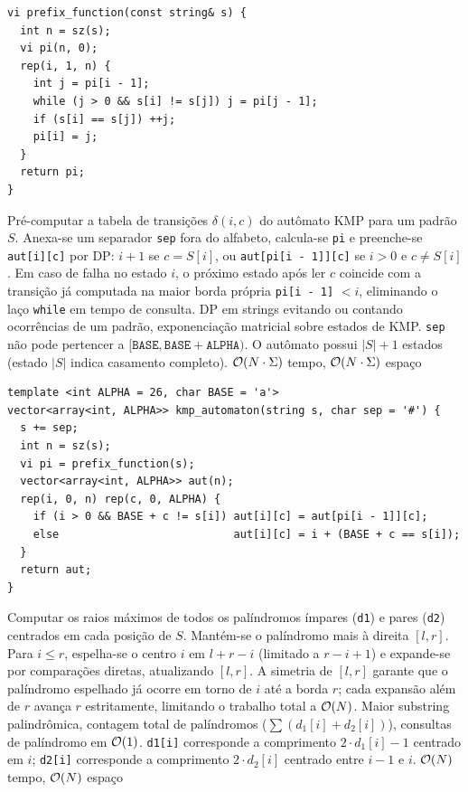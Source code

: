 \begin{lstlisting}
vi prefix_function(const string& s) {
  int n = sz(s);
  vi pi(n, 0);
  rep(i, 1, n) {
    int j = pi[i - 1];
    while (j > 0 && s[i] != s[j]) j = pi[j - 1];
    if (s[i] == s[j]) ++j;
    pi[i] = j;
  }
  return pi;
}
\end{lstlisting}

\algobox
  {Pré-computar a tabela de transições $\delta(i, c)$ do autômato KMP para um padrão $S$.}
  {Anexa-se um separador \texttt{sep} fora do alfabeto, calcula-se \texttt{pi} e preenche-se \texttt{aut[i][c]} por DP: $i + 1$ se $c = S[i]$, ou \texttt{aut[pi[i - 1]][c]} se $i > 0$ e $c \neq S[i]$.}
  {Em caso de falha no estado $i$, o próximo estado após ler $c$ coincide com a transição já computada na maior borda própria \texttt{pi[i - 1]} $< i$, eliminando o laço \texttt{while} em tempo de consulta.}
  {DP em strings evitando ou contando ocorrências de um padrão, exponenciação matricial sobre estados de KMP.}
  {\texttt{sep} não pode pertencer a $[\texttt{BASE}, \texttt{BASE}+\texttt{ALPHA})$. O autômato possui $|S| + 1$ estados (estado $|S|$ indica casamento completo).}
  {$\mathcal{O}(N \cdot \Sigma)$ tempo, $\mathcal{O}(N \cdot \Sigma)$ espaço}

\begin{lstlisting}
template <int ALPHA = 26, char BASE = 'a'>
vector<array<int, ALPHA>> kmp_automaton(string s, char sep = '#') {
  s += sep;
  int n = sz(s);
  vi pi = prefix_function(s);
  vector<array<int, ALPHA>> aut(n);
  rep(i, 0, n) rep(c, 0, ALPHA) {
    if (i > 0 && BASE + c != s[i]) aut[i][c] = aut[pi[i - 1]][c];
    else                           aut[i][c] = i + (BASE + c == s[i]);
  }
  return aut;
}
\end{lstlisting}

\algobox
  {Computar os raios máximos de todos os palíndromos ímpares (\texttt{d1}) e pares (\texttt{d2}) centrados em cada posição de $S$.}
  {Mantém-se o palíndromo mais à direita $[l, r]$. Para $i \le r$, espelha-se o centro $i$ em $l + r - i$ (limitado a $r - i + 1$) e expande-se por comparações diretas, atualizando $[l, r]$.}
  {A simetria de $[l, r]$ garante que o palíndromo espelhado já ocorre em torno de $i$ até a borda $r$; cada expansão além de $r$ avança $r$ estritamente, limitando o trabalho total a $\mathcal{O}(N)$.}
  {Maior substring palindrômica, contagem total de palíndromos ($\sum (d_1[i] + d_2[i])$), consultas de palíndromo em $\mathcal{O}(1)$.}
  {\texttt{d1[i]} corresponde a comprimento $2\cdot d_1[i] - 1$ centrado em $i$; \texttt{d2[i]} corresponde a comprimento $2\cdot d_2[i]$ centrado entre $i - 1$ e $i$.}
  {$\mathcal{O}(N)$ tempo, $\mathcal{O}(N)$ espaço}

